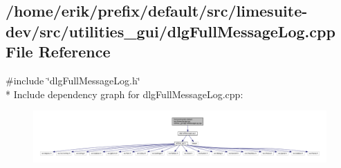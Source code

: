 \subsection{/home/erik/prefix/default/src/limesuite-\/dev/src/utilities\+\_\+gui/dlg\+Full\+Message\+Log.cpp File Reference}
\label{dlgFullMessageLog_8cpp}
{\ttfamily \#include \char`\"{}dlg\+Full\+Message\+Log.\+h\char`\"{}}\\*
Include dependency graph for dlg\+Full\+Message\+Log.\+cpp\+:
\nopagebreak
\begin{figure}[H]
\begin{center}
\leavevmode
\includegraphics[width=350pt]{d5/d2f/dlgFullMessageLog_8cpp__incl}
\end{center}
\end{figure}
